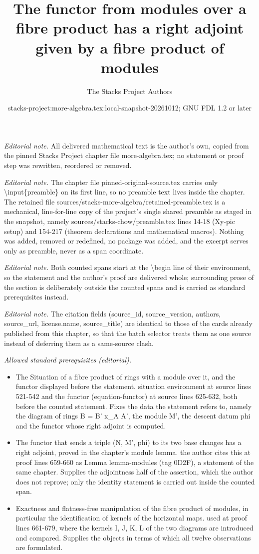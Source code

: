 \documentclass[10pt,a4paper]{amsart}
\title{The functor from modules over a fibre product has a right adjoint given by a fibre product of modules}
\author{The Stacks Project Authors}
\date{stacks-project:more-algebra.tex:local-snapshot-20261012; GNU FDL 1.2 or later}
\theoremstyle{plain}
\theoremstyle{definition}
\theoremstyle{remark}
\numberwithin{equation}{subsection}
\begin{document}
\maketitle
\setcounter{subsection}{1}
\noindent\textit{Editorial note.} All delivered mathematical text is the author's own, copied from the pinned Stacks Project chapter file more-algebra.tex; no statement or proof step was rewritten, reordered or removed.\par\medskip
\noindent\textit{Editorial note.} The chapter file pinned-original-source.tex carries only \textbackslash{}input\{preamble\} on its first line, so no preamble text lives inside the chapter. The retained file sources/stacks-more-algebra/retained-preamble.tex is a mechanical, line-for-line copy of the project's single shared preamble as staged in the snapshot, namely sources/stacks-chow/preamble.tex lines 14-18 (Xy-pic setup) and 154-217 (theorem declarations and mathematical macros). Nothing was added, removed or redefined, no package was added, and the excerpt serves only as preamble, never as a span coordinate.\par\medskip
\noindent\textit{Editorial note.} Both counted spans start at the \textbackslash{}begin line of their environment, so the statement and the author's proof are delivered whole; surrounding prose of the section is deliberately outside the counted spans and is carried as standard prerequisites instead.\par\medskip
\noindent\textit{Editorial note.} The citation fields (source\_id, source\_version, authors, source\_url, license.name, source\_title) are identical to those of the cards already published from this chapter, so that the batch selector treats them as one source instead of deferring them as a same-source clash.\par\medskip
\noindent\textit{Allowed standard prerequisites (editorial).}\begin{itemize}
\item The Situation of a fibre product of rings with a module over it, and the functor displayed before the statement. situation environment at source lines 521-542 and the functor (equation-functor) at source lines 625-632, both before the counted statement. Fixes the data the statement refers to, namely the diagram of rings B = B' x\_A A', the module M', the descent datum phi and the functor whose right adjoint is computed.
\item The functor that sends a triple (N, M', phi) to its two base changes has a right adjoint, proved in the chapter's module lemma. the author cites this at proof lines 659-660 as Lemma lemma-modules (tag 0D2F), a statement of the same chapter. Supplies the adjointness half of the assertion, which the author does not reprove; only the identity statement is carried out inside the counted span.
\item Exactness and flatness-free manipulation of the fibre product of modules, in particular the identification of kernels of the horizontal maps. used at proof lines 661-679, where the kernels I, J, K, L of the two diagrams are introduced and compared. Supplies the objects in terms of which all twelve observations are formulated.
\end{itemize}\medskip
\end{document}
